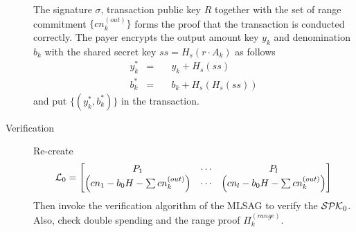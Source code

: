 \begin{description}
		The signature \(\sigma\), transaction public key \(R\) together with the set of range commitment \(\{cn_k^{(out)}\}\) forms the proof that the transaction is conducted correctly. The payer encrypts the output amount key \(y_k\) and denomination \(b_k\) with the shared secret key \(ss=H_s(r\cdot A_k)\) as follows
		\[
			\begin{aligned}
				y_k^* &= &\quad y_k+H_s(ss) \\
				b_k^* &= &\quad b_k+H_s(H_s(ss))
			\end{aligned}
		\]
		and put \(\{(y_k^*,b_k^*)\}\) in the transaction.
		\item[Verification] Re-create 
			\[
				\mathcal{L}_0=
				\begin{bmatrix}
					P_1 &\cdots &P_l \\
					\left(cn_1-b_0H-\sum cn_k^{(out)}\right) &\cdots &\left(cn_l-b_0H-\sum cn_k^{(out)}\right)			
				\end{bmatrix}
			\]
			Then invoke the verification algorithm of the MLSAG to verify the \(\mathcal{SPK}_0\). Also, check double spending and the range proof \(\Pi_k^{(range)}\).
	\end{description}
